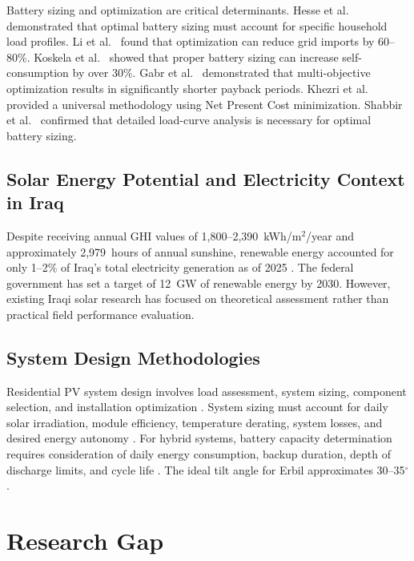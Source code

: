 Battery sizing and optimization are critical determinants. Hesse et al.\ \cite{hesse2017} demonstrated that optimal battery sizing must account for specific household load profiles. Li et al.\ \cite{li2019} found that optimization can reduce grid imports by 60--80\%. Koskela et al.\ \cite{koskela2019} showed that proper battery sizing can increase self-consumption by over 30\%. Gabr et al.\ \cite{gabr2021} demonstrated that multi-objective optimization results in significantly shorter payback periods. Khezri et al.\ \cite{khezri2020} provided a universal methodology using Net Present Cost minimization. Shabbir et al.\ \cite{shabbir2017} confirmed that detailed load-curve analysis is necessary for optimal battery sizing.


\subsection{Solar Energy Potential and Electricity Context in Iraq}

Despite receiving annual GHI values of 1,800--2,390~kWh/m$^{2}$/year and approximately 2,979~hours of annual sunshine, renewable energy accounted for only 1--2\% of Iraq's total electricity generation as of 2025 \cite{irena2024,eia2024}. The federal government has set a target of 12~GW of renewable energy by 2030. However, existing Iraqi solar research has focused on theoretical assessment rather than practical field performance evaluation.


\subsection{System Design Methodologies}

Residential PV system design involves load assessment, system sizing, component selection, and installation optimization \cite{bandyopadhyay2020}. System sizing must account for daily solar irradiation, module efficiency, temperature derating, system losses, and desired energy autonomy \cite{mulleriyawage2020}. For hybrid systems, battery capacity determination requires consideration of daily energy consumption, backup duration, depth of discharge limits, and cycle life \cite{shabbir2017}. The ideal tilt angle for Erbil approximates 30--35$^{\circ}$.


\section{Research Gap}

